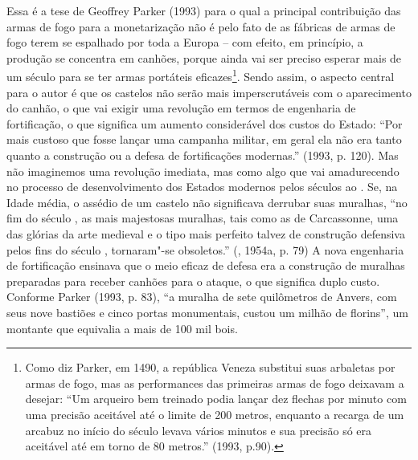 Essa é a tese de Geoffrey Parker (1993) para o qual a principal
contribuição das armas de fogo para a monetarização não é pelo fato de
as fábricas de armas de fogo terem se espalhado por toda a Europa -- com
efeito, em princípio, a produção se concentra em canhões, porque ainda
vai ser preciso esperar mais de um século para se ter armas portáteis
eficazes\footnote{Como diz Parker, em 1490, a república Veneza substitui
  suas arbaletas por armas de fogo, mas as performances das primeiras
  armas de fogo deixavam a desejar: ``Um arqueiro bem treinado podia
  lançar dez flechas por minuto com uma precisão aceitável até o limite
  de 200 metros, enquanto a recarga de um arcabuz no início do século
   levava vários minutos e sua precisão só era aceitável até em torno
  de 80 metros.'' (1993, p.90).}. Sendo assim, o aspecto central para o
autor é que os castelos não serão mais imperscrutáveis com o
aparecimento do canhão, o que vai exigir uma revolução em termos de
engenharia de fortificação, o que significa um aumento considerável dos
custos do Estado: ``Por mais custoso que fosse lançar uma campanha
militar, em geral ela não era tanto quanto a construção ou a defesa de
fortificações modernas.'' (1993, p. 120). Mas não imaginemos uma
revolução imediata, mas como algo que vai amadurecendo no processo de
desenvolvimento dos Estados modernos pelos séculos  ao . Se, na
Idade média, o assédio de um castelo não significava derrubar suas
muralhas, ``no fim do século , as mais majestosas muralhas, tais como
as de Carcassonne, uma das glórias da arte medieval e o tipo mais
perfeito talvez de construção defensiva pelos fins do século ,
tornaram"-se obsoletos.'' (, 1954a, p. 79) A nova engenharia de
fortificação ensinava que o meio eficaz de defesa era a construção de
muralhas preparadas para receber canhões para o ataque, o que significa
duplo custo. Conforme Parker (1993, p. 83), ``a muralha de sete
quilômetros de Anvers, com seus nove bastiões e cinco portas
monumentais, custou um milhão de florins'', um montante que equivalia a
mais de 100 mil bois.

